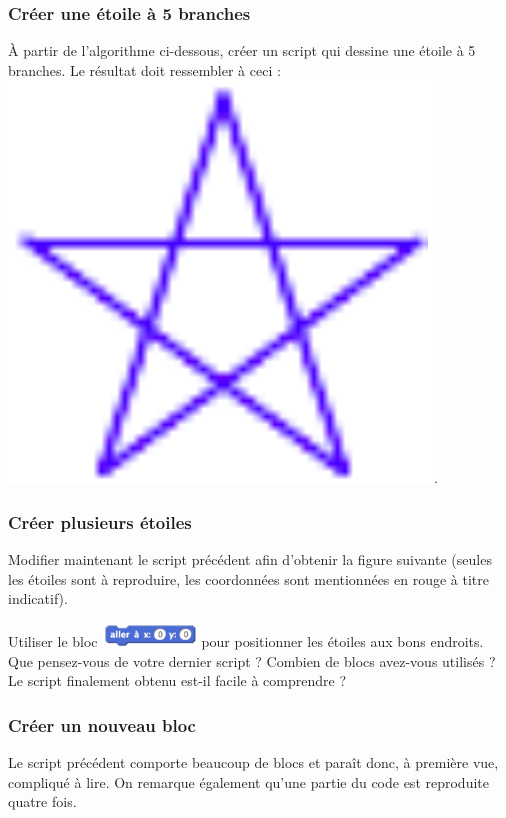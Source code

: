 
\subsubsection{Créer une étoile à 5 branches}


À partir de l’algorithme ci-dessous, créer un script qui dessine une étoile à 5 branches.
Le résultat doit ressembler à ceci : \includegraphics[width=.9cm]{./images/scratch03/fonction/Scratch_Fonctions_02}.

\subsubsection{Créer plusieurs étoiles}

Modifier maintenant le script précédent afin d’obtenir la figure suivante (seules les étoiles sont à reproduire, les coordonnées sont mentionnées en rouge à titre indicatif).


Utiliser le bloc \includegraphics[width=2.5cm]{./images/scratch03/fonction/Scratch_Fonctions_04} pour positionner les étoiles aux bons endroits.
Que pensez-vous de votre dernier script ? Combien de blocs avez-vous utilisés ? Le script finalement obtenu est-il facile à comprendre ?

\subsubsection{Créer un nouveau bloc}

Le script précédent comporte beaucoup de blocs et paraît donc, à première vue, compliqué à lire. On remarque également qu’une partie du code est reproduite quatre fois.

